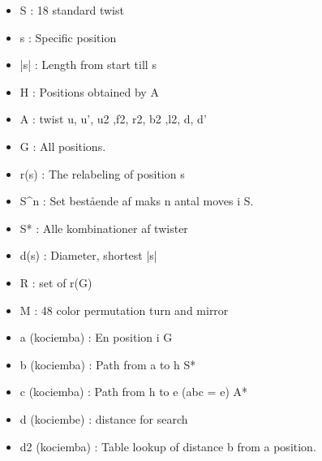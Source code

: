 \begin{itemize}
\item S : 18 standard twist
\item s : Specific position
\item |s| : Length from start till s
\item H : Positions obtained by A
\item A : twist u, u', u2 ,f2, r2, b2 ,l2, d, d'
\item G : All positions. 
\item r(s) : The relabeling of position s
\item S^{n} : Set best\aa{}ende af maks n antal moves i S.
\item S* : Alle kombinationer af twister
\item d(s) : Diameter, shortest |s|
\item R : set of r(G)
\item M : 48 color permutation turn and mirror

\item a (kociemba) : En position i G
\item b (kociemba) : Path from a to h S*
\item c (kociemba) : Path from h to e (abc = e) A*
\item d (kociembe) : distance for search
\item d2 (kociemba) : Table lookup of distance b from a position.

\end{itemize}